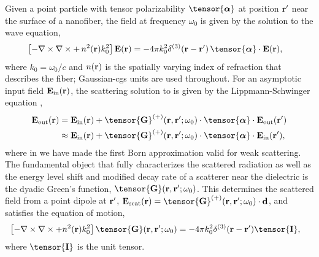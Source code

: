 \documentclass[preprint, aps,pra,onecolumn]{revtex4-1} %
\newcommand{\inp}{{\rm in}}
\newcommand{\out}{{\rm out}}
\newcommand{\unittens}{\tensor{\mathbf{I}}}
\begin{document}
Given a point particle with tensor polarizability $\tensor{\boldsymbol{\alpha}}$ at position $\mathbf{r}'$ near the surface of a nanofiber, the field  at frequency $\omega_0$ is given by the solution to the wave equation, 
	\begin{align}\label{Eq::WaveEquationSource}
		\left[ - \nabla \times\nabla \times + \, n^2(\br)k_0^2 \right] \mathbf{E}(\br) &= -4\pi  k_0^2 \delta^{(3)}(\br-\br')\,  \tensor{\boldsymbol{\alpha}}\cdot \mathbf{E}(\br),
	\end{align}
where $k_0=\omega_0/c$ and $n(\mathbf{r})$ is the spatially varying index of refraction that describes the fiber; Gaussian-cgs units are used throughout.  
For an asymptotic input field $\mathbf{E}_{\inp}(\br)$, the scattering solution to  is given by the Lippmann-Schwinger equation \cite{wubs_multiple-scattering_2004},
	\begin{align}
		\mathbf{E}_{\out}(\br) &=\mathbf{E}_{\inp}(\br)+\tensor{\mathbf{G}}^{(+)}(\br , \br'; \omega_0)\cdot 
\tensor{\boldsymbol{\alpha}}\cdot \mathbf{E}_{\out}(\br')\\
		&\approx \mathbf{E}_{\inp}(\br)+ \tensor{\mathbf{G}}^{(+)}(\br , \br'; \omega_0) \cdot 
\tensor{\boldsymbol{\alpha}}\cdot \mathbf{E}_{\inp}(\br'), \label{Eq::ScatteredField}
	\end{align}
where in  we have made the first Born approximation valid for weak scattering. The fundamental object that fully characterizes the scattered radiation as well as the energy level shift and modified decay rate of a scatterer near the dielectric is the dyadic Green's function, $\tensor{\mathbf{G}}(\br, \br';\omega_0)$. This determines the scattered field from a point dipole at $\mathbf{r}'$, $\mathbf{E}_{\rm scat}(\br)= \tensor{\mathbf{G}}^{(+)}(\br , \br'; \omega_0)\cdot \mathbf{d}$, and satisfies the equation of motion,
	\begin{align} \label{Eq::GreensDiffEq}
		\left[ -\nabla\times\nabla\times + n^2(\mbf{r}) k_0^2 \right] \tensor{\mathbf{G}}(\br, \br';\omega_0) &= -4\pi 
k_0^2 \delta^{(3)}(\mathbf{r}-\mathbf{r}') \unittens,
	\end{align}
where $\unittens$ is the unit tensor.   
\end{document}
